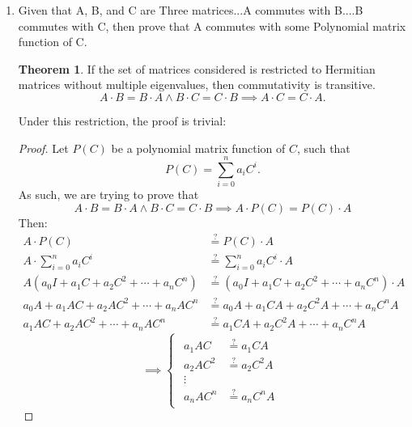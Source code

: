 \documentclass{zc-ust-hw}
\theoremstyle{definition}
\newtheorem{theorem}{Theorem}
\begin{document}
\begin{enumerate}
  \item Given that A, B, and C are Three matrices...A commutes with B....B
    commutes with C, then prove that A commutes with some Polynomial matrix
    function of C.
    \begin{theorem}
      \label{thm:commutativity}
      If the set of matrices considered is restricted to Hermitian matrices
      without multiple eigenvalues, then commutativity is transitive.
      \begin{equation*}
        A\cdot B=B\cdot A \land B\cdot C=C\cdot B \implies A\cdot C=C\cdot A
      .\end{equation*}
    \end{theorem}
    Under this restriction, the proof is trivial:
    \begin{proof}
      Let $P(C)$ be a polynomial matrix function of $C$, such that
      \begin{equation}
        P(C) = \sum_{i=0}^{n} a_i C^i
      .\end{equation}
      As such, we are trying to prove that
      \begin{equation}
        A\cdot B=B\cdot A \land B\cdot C=C\cdot B \implies A\cdot P(C)=P(C)\cdot A
      \end{equation}
      Then:
      \begin{align}
        A\cdot P(C) &\overset{?}{=} P(C)\cdot A \\
        A\cdot \sum_{i=0}^{n} a_i C^i &\overset{?}{=} \sum_{i=0}^{n} a_i C^i \cdot A \\
        A(a_0 I + a_1 C + a_2 C^2 + \cdots + a_n C^n) &\overset{?}{=} (a_0 I + a_1 C + a_2 C^2 + \cdots + a_n C^n) \cdot A \\
        a_0 A + a_1 AC + a_2 AC^2 + \cdots + a_n AC^n &\overset{?}{=} a_0 A + a_1 CA + a_2 C^2A + \cdots + a_n C^nA \\
        a_1 AC + a_2 AC^2 + \cdots + a_n AC^n &\overset{?}{=} a_1 CA + a_2 C^2A + \cdots + a_n C^nA
      \end{align}
      \begin{equation}
        \implies 
        \begin{cases}
          \begin{split}
            a_1 AC &\overset{?}{=} a_1 CA \\
            a_2 AC^2 &\overset{?}{=} a_2 C^2A \\
            \vdots \\
            a_n AC^n &\overset{?}{=} a_n C^nA

\end{split}
\end{cases}
\end{equation}
\end{proof}
\end{enumerate}
\end{document}
